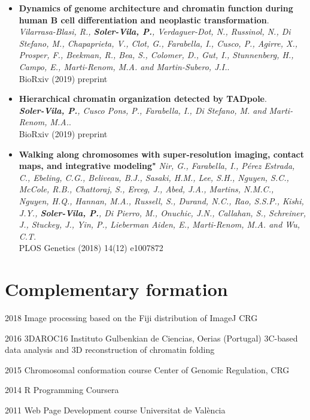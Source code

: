 \documentclass[]{friggeri-cv} %
\begin{document}
\begin{itemize}
    \item \textbf{Dynamics of genome architecture and chromatin function during human B cell differentiation and neoplastic transformation}.\\
   \emph{ Vilarrasa-Blasi, R.,  \textbf{Soler-Vila, P.},  Verdaguer-Dot, N.,  Russinol, N.,  Di Stefano, M.,  Chapaprieta, V.,  Clot, G.,  Farabella, I.,  Cusco, P.,  Agirre, X.,  Prosper, F.,  Beekman, R.,  Bea, S.,  Colomer, D.,  Gut, I.,  Stunnenberg, H.,  Campo, E.,  Marti-Renom, M.A. and Martin-Subero, J.I.}.\\
BioRxiv (2019) preprint
    \item \textbf{Hierarchical chromatin organization detected by TADpole}.\\
    \emph{  \textbf{Soler-Vila, P.},  Cusco Pons, P.,  Farabella, I.,  Di Stefano, M. and Marti-Renom, M.A.}.\\
	BioRxiv (2019) preprint
    \item \textbf{Walking along chromosomes with super-resolution imaging, contact maps, and integrative modeling"}
    \emph{ Nir, G.,  Farabella, I.,  Pérez Estrada, C.,   Ebeling, C.G.,  Beliveau, B.J.,  Sasaki, H.M.,  Lee, S.H.,  Nguyen, S.C.,  McCole, R.B.,  Chattoraj, S.,  Erceg, J.,  Abed, J.A.,  Martins, N.M.C.,   Nguyen, H.Q.,  Hannan, M.A.,  Russell, S.,  Durand, N.C.,  Rao, S.S.P.,  Kishi, J.Y.,  \textbf{Soler-Vila, P.},  Di Pierro, M.,  Onuchic, J.N.,  Callahan, S.,  Schreiner, J.,  Stuckey, J.,  Yin, P.,  Lieberman Aiden, E.,  Marti-Renom, M.A. and Wu, C.T}.\\
PLOS Genetics (2018) 14(12) e1007872
\end{itemize}

\vspace{5mm}

\section{Complementary formation}

\begin{entrylist}

\entry
{2018}
{Image processing based on the Fiji distribution of ImageJ}
{CRG}

\entry
{2016}
{3DAROC16}
{Instituto Gulbenkian de Ciencias, Oerias (Portugal)}
{3C-based data analysis and 3D reconstruction of chromatin folding}

\entry
{2015}
{Chromosomal conformation course}
{Center of Genomic Regulation, CRG}

\entry
{2014}
{R Programming}
{Coursera}

\entry
{2011}
{Web Page Development course}
{Universitat de València}

\end{entrylist}
\end{document}
